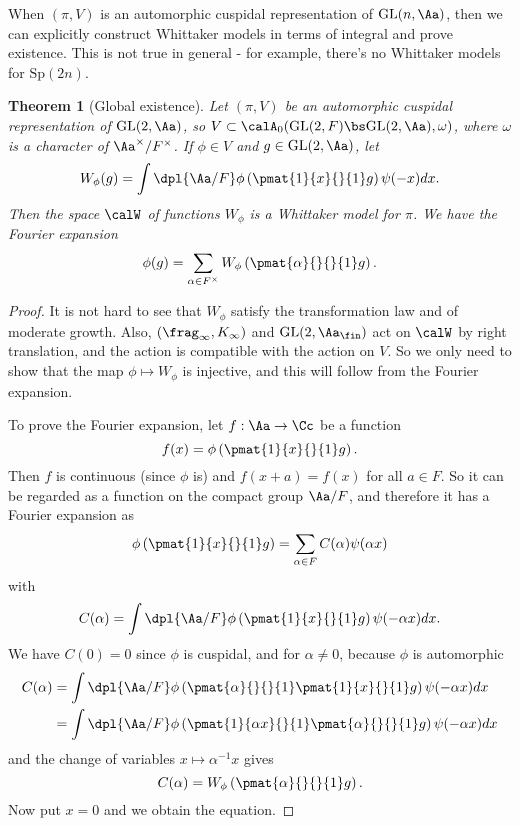 \documentclass{article}
\newtheorem{theorem}{Theorem}[section]
\newcommand{\GL}{\mathrm{GL}}
\begin{document}
When $(\pi, V)$ is an automorphic cuspidal representation of $\GL(n, \Aa)$, then we can explicitly construct Whittaker models in terms of integral and prove existence. 
This is not true in general - for example, there's no Whittaker models for $\mathrm{Sp}(2n)$. 
\begin{theorem}[Global existence]
Let $(\pi, V)$ be an automorphic cuspidal representation of $\GL(2, \Aa)$, so $V\subset \calA_{0}(\GL(2, F)\bs \GL(2, \Aa), \omega)$, where $\omega$ is a character of $\Aa^{\times}/F^{\times}$. 
If $\phi\in V$ and $g\in \GL(2, \Aa)$, let 
$$
W_{\phi}(g) = \int\dpl{\Aa/F}\phi\left( \pmat{1}{x}{}{1}g\right) \psi(-x)dx. 
$$
Then the space $\calW$ of functions $W_{\phi}$ is a Whittaker model for $\pi$. 
We have the Fourier expansion 
$$
\phi(g) = \sum_{\alpha\in F^{\times}} W_{\phi} \left( \pmat{\alpha}{}{}{1}g\right).
$$
\end{theorem}
\begin{proof}
It is not hard to see that $W_{\phi}$ satisfy the transformation law and of moderate growth. 
Also, $(\frag_\infty, K_\infty)$ and $\GL(2, \Aa_{\fin})$ act on $\calW$ by right translation, and the action is compatible with the action on $V$. 
So we only need to show that the map $\phi\mapsto W_{\phi}$ is injective, and this will follow from the Fourier expansion. 

To prove the Fourier expansion, let $f:\Aa \to \Cc$ be a function 
$$
f(x) = \phi\left( \pmat{1}{x}{}{1} g\right). 
$$
Then $f$ is continuous (since $\phi$ is) and $f(x+a) = f(x)$ for all $a\in F$. 
So it can be regarded as a function on the compact group $\Aa/F$, and therefore it has a Fourier expansion as
$$
\phi\left( \pmat{1}{x}{}{1} g\right) = \sum_{\alpha\in F} C(\alpha) \psi(\alpha x)
$$
with 
$$
C(\alpha) = \int\dpl{\Aa/F} \phi\left( \pmat{1}{x}{}{1} g\right) \psi(-\alpha x)dx. 
$$
We have $C(0) = 0$ since $\phi$ is cuspidal, and for $\alpha \neq 0$, because $\phi$ is automorphic
\begin{align*}
C(\alpha) &= \int\dpl{\Aa/F} \phi\left( \pmat{\alpha}{}{}{1} \pmat{1}{x}{}{1} g\right) \psi(-\alpha x) dx \\
&= \int\dpl{\Aa/F} \phi\left( \pmat{1}{\alpha x}{}{1} \pmat{\alpha}{}{}{1} g\right) \psi(-\alpha x) dx
\end{align*}
and the change of variables $x\mapsto \alpha^{-1} x$ gives 
$$
C(\alpha) = W_{\phi}\left(\pmat{\alpha}{}{}{1} g\right). 
$$
Now put $x = 0$ and we obtain the equation. 
\end{proof}
\end{document}
